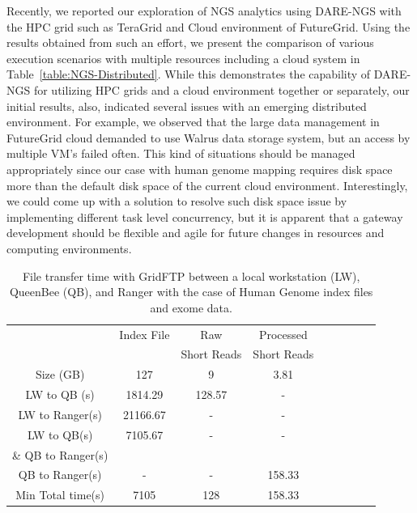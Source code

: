 \documentclass{sig-alternate}
\begin{document}
\begin{figure}
  \label{fig:dare-rfold-result} 
\end{figure}

Recently, we reported our exploration of NGS analytics using DARE-NGS
with the HPC grid such as TeraGrid and Cloud environment of
FutureGrid\cite{ecmls11}.  Using the results obtained from such an
effort, we present the comparison of various execution scenarios with
multiple resources including a cloud system in
Table~\ref{table:NGS-Distributed}.  While this demonstrates the
capability of DARE-NGS for utilizing HPC grids and a cloud environment
together or separately, our initial results, also, indicated several
issues with an emerging distributed environment.  For example, we
observed that the large data management in FutureGrid cloud demanded
to use Walrus data storage system, but an access by multiple VM's
failed often.  This kind of situations should be managed appropriately
since our case with human genome mapping requires disk space more than
the default disk space of the current cloud
environment. Interestingly, we could come up with a solution to
resolve such disk space issue by implementing different task level
concurrency, but it is apparent that a gateway development should be
flexible and agile for future changes in resources and computing
environments.

 \begin{table}
 \small
 \begin{tabular}{|c|c|c|c|c|c|c|c|c|} 
 \hline 
	                      &  Index File	&Raw &	Processed\\
	                      &&Short Reads& Short Reads\\
\hline 
Size  (GB)    	             &127&	9	&3.81\\
 \hline                       
LW to QB (s)   & 1814.29&	128.57&  -\\
  \hline
LW to Ranger(s) & 21166.67 & - & -\\
   \hline
LW to QB(s)    & 7105.67& - &-\\
 \& QB to Ranger(s)     &&&\\
 \hline
QB to Ranger(s)   	&-&-& 158.33\\
\hline
Min Total time(s)    &	7105 &	128&	158.33\\
 \hline
\end{tabular}
\caption{File transfer time with GridFTP between a local workstation (LW), QueenBee (QB), and Ranger with the case of Human Genome index files and exome data.  }

 \label{table:NGS-Distributed-file} 
\end{table}
\end{document}

